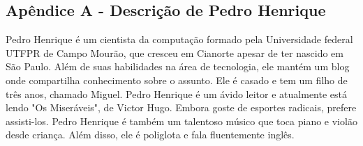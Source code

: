 \documentclass[
	12pt,				%
	oneside,   	        %
	a4paper,			%
	chapter=TITLE,		%
	section=TITLE,		%
	subsection=TITLE,	%
	subsubsection=TITLE,%
	english,			%
	french,				%
	spanish,			%
	brazil,				%
	]{pacotes/abntex2}
\begin{document}



 \begin{apendicesenv}
 
\section*{Apêndice A - Descrição de Pedro Henrique}
\label{apend:pedrohenrique}
 
Pedro Henrique é um cientista da computação formado pela Universidade federal UTFPR de Campo Mourão, que cresceu em Cianorte apesar de ter nascido em São Paulo. Além de suas habilidades na área de tecnologia, ele mantém um blog onde compartilha conhecimento sobre o assunto. Ele é casado e tem um filho de três anos, chamado Miguel. Pedro Henrique é um ávido leitor e atualmente está lendo "Os Miseráveis", de Victor Hugo. Embora goste de esportes radicais, prefere assisti-los. Pedro Henrique é também um talentoso músico que toca piano e violão desde criança. Além disso, ele é poliglota e fala fluentemente inglês.
 
 \end{apendicesenv}




\end{document}
